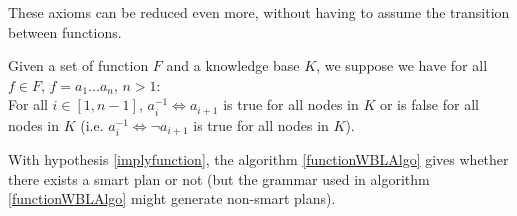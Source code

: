 \documentclass[10pt,a4paper,draft]{article}
\begin{document}
These axioms can be reduced even more, without having to assume the transition between functions.

\begin{Hypothesis}
\label{implyfunction}
Given a set of function $F$ and a knowledge base $K$, we suppose we have for all $f \in F$, $f = a_1 ... a_n$, $n > 1$: \\
For all $i \in [1, n-1]$, $a_{i}^{-1} \Leftrightarrow a_{i+1}$ is true for all nodes in $K$ or is false for all nodes in $K$ (i.e. $a_{i}^{-1} \Leftrightarrow \neg a_{i+1}$ is true for all nodes in $K$).\\
\end{Hypothesis}

\begin{Theorem}
\label{implyaxiomtheorem}
With hypothesis \ref{implyfunction}, the algorithm \ref{functionWBLAlgo} gives whether there exists a smart plan or not (but the grammar used in algorithm \ref{functionWBLAlgo} might generate non-smart plans).
\end{Theorem}
\end{document}
